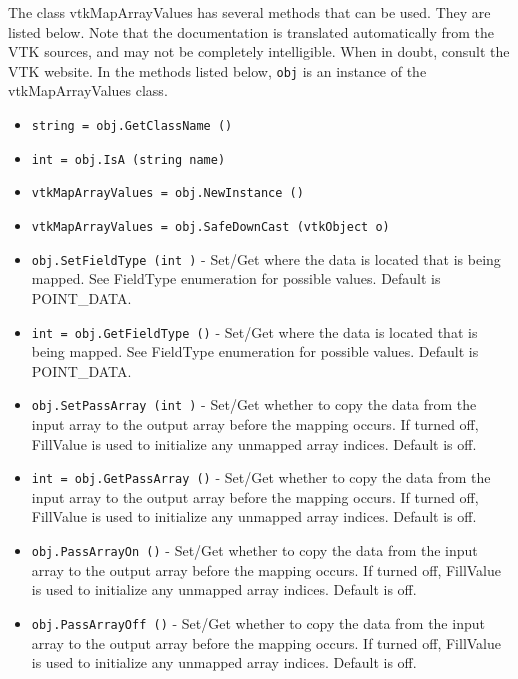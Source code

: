 The class vtkMapArrayValues has several methods that can be used.
  They are listed below.
Note that the documentation is translated automatically from the VTK sources,
and may not be completely intelligible.  When in doubt, consult the VTK website.
In the methods listed below, \verb|obj| is an instance of the vtkMapArrayValues class.
\begin{itemize}
\item  \verb|string = obj.GetClassName ()|

\item  \verb|int = obj.IsA (string name)|

\item  \verb|vtkMapArrayValues = obj.NewInstance ()|

\item  \verb|vtkMapArrayValues = obj.SafeDownCast (vtkObject o)|

\item  \verb|obj.SetFieldType (int )| -  Set/Get where the data is located that is being mapped.
 See FieldType enumeration for possible values.
 Default is POINT\_DATA.

\item  \verb|int = obj.GetFieldType ()| -  Set/Get where the data is located that is being mapped.
 See FieldType enumeration for possible values.
 Default is POINT\_DATA.

\item  \verb|obj.SetPassArray (int )| -  Set/Get whether to copy the data from the input array to the output array
 before the mapping occurs. If turned off, FillValue is used to initialize
 any unmapped array indices. Default is off.

\item  \verb|int = obj.GetPassArray ()| -  Set/Get whether to copy the data from the input array to the output array
 before the mapping occurs. If turned off, FillValue is used to initialize
 any unmapped array indices. Default is off.

\item  \verb|obj.PassArrayOn ()| -  Set/Get whether to copy the data from the input array to the output array
 before the mapping occurs. If turned off, FillValue is used to initialize
 any unmapped array indices. Default is off.

\item  \verb|obj.PassArrayOff ()| -  Set/Get whether to copy the data from the input array to the output array
 before the mapping occurs. If turned off, FillValue is used to initialize
 any unmapped array indices. Default is off.


\end{itemize}
